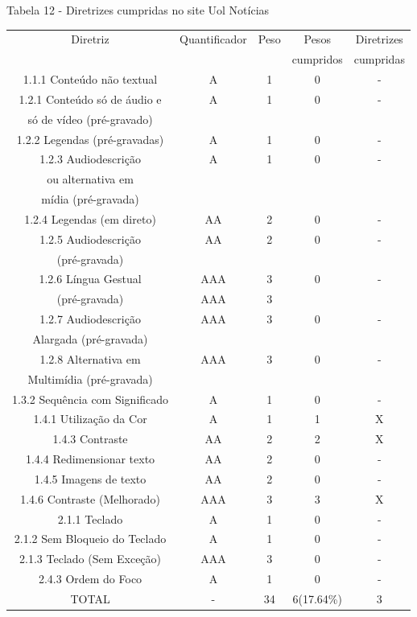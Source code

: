 \documentclass[a4paper]{article}
\begin{document}
\begin{titlepage}
Tabela 12 - Diretrizes cumpridas no site Uol Notícias\\[-1cm]
\begin{center}
	\fontsize{8pt}{8pt}\selectfont	
	\begin{longtable}{|c|c|c|c|c|}
		\hline
		Diretriz & Quantificador & Peso & Pesos & Diretrizes\\
		& & & cumpridos & cumpridas\\
		\hline
		1.1.1 Conteúdo não textual & A & 1 & 0 & - \\
		\hline
		1.2.1 Conteúdo só de áudio e & A & 1 & 0 & - \\
		só de vídeo (pré-gravado) & & & & \\
		\hline
		1.2.2 Legendas (pré-gravadas) & A & 1 & 0 & - \\
		\hline
		1.2.3 Audiodescrição & A & 1 & 0 & - \\
		ou alternativa em & & & & \\
		mídia (pré-gravada) & & & & \\
		\hline
		1.2.4 Legendas (em direto) & AA & 2 & 0 & - \\
		\hline
		1.2.5 Audiodescrição & AA & 2 & 0 & - \\
		(pré-gravada) & & & & \\
		\hline
		1.2.6 Língua Gestual & AAA & 3 & 0 & - \\
		(pré-gravada) & AAA & 3 & & \\
		\hline
		1.2.7 Audiodescrição & AAA & 3 & 0 & - \\
		Alargada (pré-gravada) & & & & \\
		\hline
		1.2.8 Alternativa em & AAA & 3 & 0 & - \\
		Multimídia (pré-gravada) & & & & \\
		\hline
		1.3.2 Sequência com Significado & A & 1 & 0 & - \\
		\hline
		1.4.1 Utilização da Cor & A & 1 & 1 & X \\
		\hline
		1.4.3 Contraste & AA & 2 & 2 & X \\
		\hline
		1.4.4 Redimensionar texto & AA & 2 & 0 & - \\
		\hline
		1.4.5 Imagens de texto & AA & 2 & 0 & - \\
		\hline
		1.4.6 Contraste (Melhorado) & AAA & 3 & 3 & X \\
		\hline
		2.1.1 Teclado & A & 1 & 0 & - \\
		\hline
		2.1.2 Sem Bloqueio do Teclado & A & 1 & 0 & - \\
		\hline
		2.1.3 Teclado (Sem Exceção) & AAA & 3 & 0 & - \\
		\hline
		2.4.3 Ordem do Foco & A & 1 & 0 & - \\
		\hline
		TOTAL & - & 34 & 6(17.64\%) & 3 \\
		\hline
	\end{longtable}
\end{center}


\end{titlepage}
\end{document}
